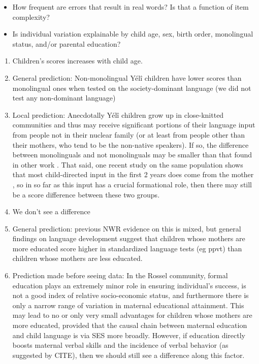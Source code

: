 \documentclass[english,,man,floatsintext]{apa6}
\providecommand{\tightlist}{%
  \setlength{\itemsep}{0pt}\setlength{\parskip}{0pt}}
\begin{document}
\begin{itemize}
\tightlist
\item
  How frequent are errors that result in real words? Is that a function of item complexity?
\item
  Is individual variation explainable by child age, sex, birth order, monolingual status, and/or parental education?
\end{itemize}

\begin{enumerate}
\def\labelenumi{\arabic{enumi}.}
\setcounter{enumi}{2}
\item
  Children's scores increases with child age.
\item
  General prediction: Non-monolingual Yélî children have lower scores than monolingual ones when tested on the society-dominant language (we did not test any non-dominant language)
\item
  Local prediction: Anecdotally Yélî children grow up in close-knitted communities and thus may receive significant portions of their language input from people not in their nuclear family
  (or at least from people other than their mothers, who tend to be the non-native speakers). If so, the difference between monolinguals and not monolinguals may be smaller than that found in other work
  . That said, one recent study on the same population shows that most child-directed input in the first 2 years does come from the mother
  , so in so far as this input has a crucial formational role, then there may still be a score difference between these two groups.
\item
  We don't see a difference
\item
  General prediction: previous NWR evidence on this is mixed, but general findings on language development suggest that children whose mothers are more educated score higher in standardized language tests (eg ppvt) than children whose mothers are less educated.
\item
  Prediction made before seeing data: In the Rossel community, formal education plays an extremely minor role in ensuring individual's success, is not a good index of relative socio-economic status, and furthermore there is only a narrow range of variation in maternal educational attainment. This may lead to no or only very small advantages for children whose mothers are more educated, provided that the causal chain between maternal education and child language is via SES more broadly. However, if education directly boosts maternal verbal skills and the incidence of verbal behavior (as suggested by CITE), then we should still see a difference along this factor.

\end{enumerate}
\end{document}
